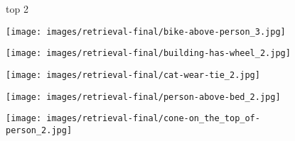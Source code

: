\documentclass[10pt,twocolumn,letterpaper]{article}
\begin{document}
\begin{figure*}[t]
	\begin{minipage}[b]{0.005\textwidth}
    	\centering
    	\begin{turn}{90}
    	top 2
    	\end{turn}
    	\vspace{3ex}
    \end{minipage}
    \hspace{0.01\textwidth}
    \begin{minipage}[t]{0.18\textwidth}
    	\centering
       	\texttt{[image: images/retrieval-final/bike-above-person\_3.jpg]}\\
       	\vspace{0.2ex}
    \end{minipage}
    \hspace{0.005\textwidth}
    \begin{minipage}[t]{0.18\textwidth}
       \centering
       \texttt{[image: images/retrieval-final/building-has-wheel\_2.jpg]}\\
       \vspace{0.2ex}
    \end{minipage}
    \hspace{0.005\textwidth}
    \begin{minipage}[t]{0.18\textwidth}
    	\centering
       	\texttt{[image: images/retrieval-final/cat-wear-tie\_2.jpg]}\\
       	\vspace{0.2ex}
    \end{minipage}
    \hspace{0.005\textwidth}
    \begin{minipage}[t]{0.18\textwidth}
    	\centering
       	\texttt{[image: images/retrieval-final/person-above-bed\_2.jpg]}\\
       	\vspace{0.2ex}
    \end{minipage}
    \hspace{0.005\textwidth}  
    \begin{minipage}[t]{0.18\textwidth}
    	\centering
       	\texttt{[image: images/retrieval-final/cone-on\_the\_top\_of-person\_2.jpg]}\\
      	\vspace{0.2ex}
    \end{minipage} 
    

\end{figure*}
\end{document}
